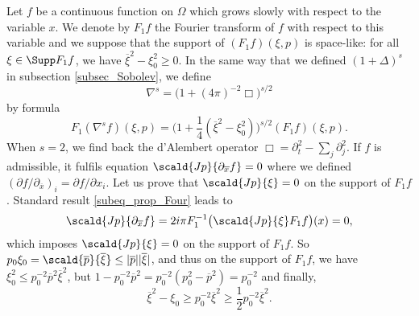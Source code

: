 Let $f$ be a continuous function on $\Omega$ which grows slowly with respect to the variable $x$. We denote by $F_1f$ the Fourier transform of $f$ with respect to this variable and we suppose that the support of $(F_1f)(\xi,p)$ is space-like: for all $\xi\in\Supp F_1f$, we have $\overline{ \xi }^2-\xi_0^2\geq0$. In the same way that we defined $(1+\Delta)^s$ in subsection \ref{subsec_Sobolev}, we define
\[
  \nabla^s=\big( 1+(4\pi)^{-2}\Box \big)^{s/2}
\]
by formula
\begin{equation}
  F_1(\nabla^sf)(\xi,p)=\big( 1+\frac{ 1 }{ 4 }(\overline{ \xi }^2-\xi_0^2) \big)^{s/2}(F_1f)(\xi,p).
\end{equation}
When $s=2$, we find back the d'Alembert operator $\Box=\partial_t^2-\sum_j\partial_j^2$. If $f$ is admissible, it fulfils equation $\scald{ Jp }{ \partial_{\overline{x}}f }=0$ where we defined $(\partial f/\partial_{\overline{x}})_i=\partial f/\partial x_i$. Let us prove that $\scald{ Jp }{ \xi }=0$ on the support of $F_1f$.	Standard result \eqref{subeq_prop_Four} leads to
\[ 
  \scald{ Jp }{ \partial_{\overline{x}}f }=2i\pi F_1^{-1}\big( \scald{ Jp }{ \xi }F_1f \big)(x)=0,
\]
which imposes $\scald{ Jp }{ \xi }=0$ on the support of $F_1f$. So $p_0\xi_0=\scald{ \overline{p} }{ \overline{\xi}}\leq| \overline{p} | |\overline{\xi} |$, and thus on the support of $F_1f$, we have $\xi_0^2\leq p_0^{-2}\overline{p}^2\overline{\xi}^2$, but $1-p_0^{-2}\overline{p}^2=p_0^{-2}(p_0^2-\overline{p}^2)=p_0^{-2}$ and finally,
\[ 
  \overline{\xi}^2-\xi_0\geq p_0^{-2}\overline{\xi}^2\geq\frac{ 1 }{2}p_0^{-2}\overline{\xi}^2.
\]

 
